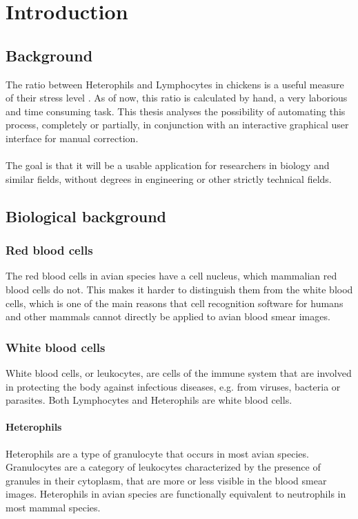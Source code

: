 \chapter{Introduction}\label{cha:intro}

\section{Background}
The ratio between Heterophils and Lymphocytes in chickens is a useful measure of their stress level \cite{hlratio}. As of now, this ratio is calculated by hand, a very laborious and time consuming task. This thesis analyses the possibility of automating this process, completely or partially, in conjunction with an interactive graphical user interface for manual correction.\\\\
The goal is that it will be a usable application for researchers in biology and similar fields, without degrees in engineering or other strictly technical fields.

\section{Biological background}
\subsection{Red blood cells}
The red blood cells in avian species have a cell nucleus, which mammalian red blood cells do not. This makes it harder to distinguish them from the white blood cells, which is one of the main reasons that cell recognition software for humans and other mammals cannot directly be applied to avian blood smear images.
\subsection{White blood cells}
White blood cells, or leukocytes, are cells of the immune system that are involved in protecting the body against infectious diseases, e.g. from viruses, bacteria or parasites. Both Lymphocytes and Heterophils are white blood cells.
\subsubsection{Heterophils}
Heterophils are a type of granulocyte that occurs in most avian species. Granulocytes are a category of leukocytes characterized by the presence of granules in their cytoplasm, that are more or less visible in the blood smear images. Heterophils in avian species are functionally equivalent to neutrophils in most mammal species.


